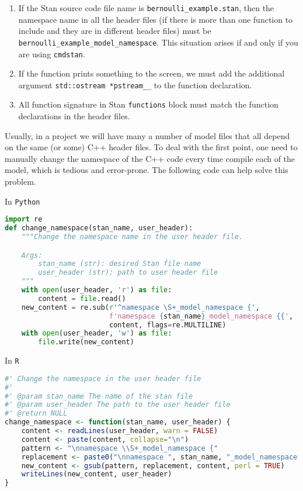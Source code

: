 \documentclass[11pt]{article}
\begin{document}
\begin{enumerate}
	\item If the Stan source code file name is \verb|bernoulli_example.stan|, then the namespace name in all the header files (if there is more than one function to include and they are in different header files) must be \verb|bernoulli_example_model_namespace|. This situation arises if and only if you are using \verb|cmdstan|.
	\item If the function prints something to the screen, we must add the additional argument \verb|std::ostream *pstream__| to the function declaration.
	\item  All function signature in Stan \verb|functions| block must match the function declarations in the header files. 
\end{enumerate}


Usually, in a project we will have many a number of model files that all depend on the same (or some) C++ header files. To deal with the first point, one need to manually change the namespace of the C++ code every time compile each of the model, which is tedious and error-prone. The following code can help solve this problem.

In \verb|Python|
\begin{lstlisting}[language=py, style=lgeneral]
import re
def change_namespace(stan_name, user_header):
    """Change the namespace name in the user header file.

    Args:
        stan_name (str): desired Stan file name
        user_header (str): path to user header file
    """
    with open(user_header, 'r') as file:
        content = file.read()
    new_content = re.sub(r'^namespace \S+_model_namespace {',
                         f'namespace {stan_name}_model_namespace {{', 
                         content, flags=re.MULTILINE)
    with open(user_header, 'w') as file:
        file.write(new_content)
\end{lstlisting}


In \verb|R|
\begin{lstlisting}[language=R, style=lgeneral]
#' Change the namespace in the user header file
#' 
#' @param stan_name The name of the stan file
#' @param user_header The path to the user header file
#' @return NULL
change_namespace <- function(stan_name, user_header) {
    content <- readLines(user_header, warn = FALSE)
    content <- paste(content, collapse="\n")
    pattern <- "\nnamespace \\S+_model_namespace {"
    replacement <- paste0("\nnamespace ", stan_name, "_model_namespace {")
    new_content <- gsub(pattern, replacement, content, perl = TRUE)
    writeLines(new_content, user_header)
}
	
\end{lstlisting}
\end{document}
